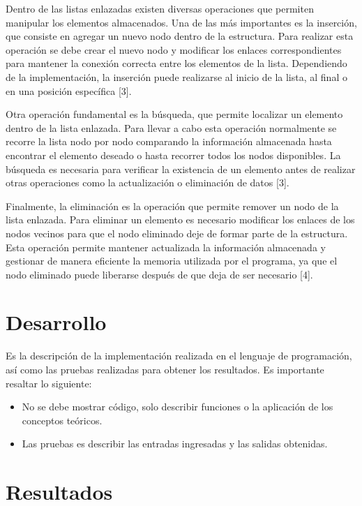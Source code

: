 \documentclass[letterpaper,12pt,oneside]{article}
\begin{document}
Dentro de las listas enlazadas existen diversas operaciones que permiten manipular los elementos almacenados. Una de las más importantes es la inserción, que consiste en agregar un nuevo nodo dentro de la estructura. Para realizar esta operación se debe crear el nuevo nodo y modificar los enlaces correspondientes para mantener la conexión correcta entre los elementos de la lista. Dependiendo de la implementación, la inserción puede realizarse al inicio de la lista, al final o en una posición específica [3].

Otra operación fundamental es la búsqueda, que permite localizar un elemento dentro de la lista enlazada. Para llevar a cabo esta operación normalmente se recorre la lista nodo por nodo comparando la información almacenada hasta encontrar el elemento deseado o hasta recorrer todos los nodos disponibles. La búsqueda es necesaria para verificar la existencia de un elemento antes de realizar otras operaciones como la actualización o eliminación de datos [3].

Finalmente, la eliminación es la operación que permite remover un nodo de la lista enlazada. Para eliminar un elemento es necesario modificar los enlaces de los nodos vecinos para que el nodo eliminado deje de formar parte de la estructura. Esta operación permite mantener actualizada la información almacenada y gestionar de manera eficiente la memoria utilizada por el programa, ya que el nodo eliminado puede liberarse después de que deja de ser necesario [4].

\section{Desarrollo}

Es la descripción de la implementación realizada en el lenguaje de programación, así como las pruebas realizadas para obtener los resultados. Es importante resaltar lo siguiente:

\begin{itemize}
\item No se debe mostrar código, solo describir funciones o la aplicación de los conceptos teóricos.
\item Las pruebas es describir las entradas ingresadas y las salidas obtenidas.
\end{itemize}

\section{Resultados}
\end{document}
